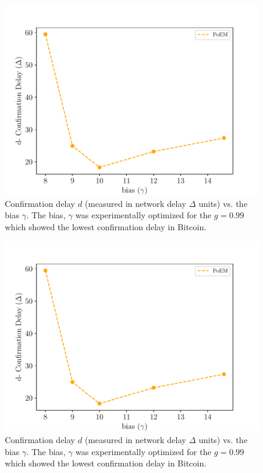 \iftwocolumn
\begin{figure}[h]
    \centering
    \includegraphics[width=\columnwidth,keepaspectratio]{figures/gamma.pdf}
    \caption{Confirmation delay $d$ (measured in network delay $\Delta$ units) vs. the bias $\gamma$. The bias, $\gamma$ was experimentally optimized for the $g = 0.99$ which showed the lowest confirmation delay in Bitcoin.
    }
    \label{fig:bias}
\end{figure}
\else
\begin{figure}[h]
    \centering
    \includegraphics[width=0.8 \columnwidth,keepaspectratio]{figures/gamma.pdf}
    \caption{Confirmation delay $d$ (measured in network delay $\Delta$ units) vs. the bias $\gamma$. The bias, $\gamma$ was experimentally optimized for the $g = 0.99$ which showed the lowest confirmation delay in Bitcoin.
    }
    \label{fig:bias}
\end{figure}
\fi